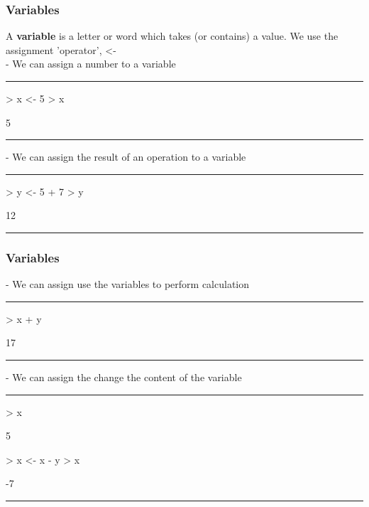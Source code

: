 \documentclass{beamer}
\begin{document}
\begin{frame}[fragile]
	\frametitle{Variables}
	A \textbf{variable} is a letter or word which takes (or contains) a value. We use the assignment 'operator', <-\\
	\vspace{10pt}
	- We can assign a number to a variable
	\rule{\textwidth}{0.4pt}
\begin{Schunk}
\begin{Sinput}
> x <- 5
> x
\end{Sinput}
\begin{Soutput}
[1] 5
\end{Soutput}
\end{Schunk}
 \rule{\textwidth}{0.4pt}
 - We can assign the result of an operation to a variable
 \rule{\textwidth}{0.4pt}
\begin{Schunk}
\begin{Sinput}
> y <- 5 + 7
> y
\end{Sinput}
\begin{Soutput}
[1] 12
\end{Soutput}
\end{Schunk}
\rule{\textwidth}{0.4pt}
\end{frame}

\begin{frame}[fragile]
	\frametitle{Variables}
	- We can assign use the variables to perform calculation
	\rule{\textwidth}{0.4pt}
\begin{Schunk}
\begin{Sinput}
> x + y
\end{Sinput}
\begin{Soutput}
[1] 17
\end{Soutput}
\end{Schunk}
 \rule{\textwidth}{0.4pt}
 - We can assign the change the content of the variable
 \rule{\textwidth}{0.4pt}
\begin{Schunk}
\begin{Sinput}
> x
\end{Sinput}
\begin{Soutput}
[1] 5
\end{Soutput}
\begin{Sinput}
> x <- x - y
> x
\end{Sinput}
\begin{Soutput}
[1] -7
\end{Soutput}
\end{Schunk}
\rule{\textwidth}{0.4pt}
\end{frame}
\end{document}
